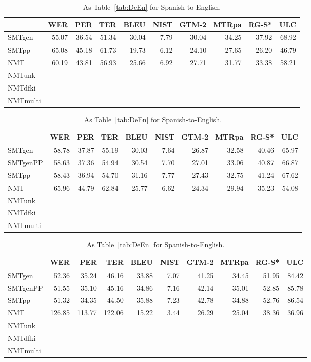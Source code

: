 \documentclass[a4paper,11pt]{article}
\begin{document}
\begin{table}[t]
\small
{}
\begin{tabular}{lrrrrrrrrr}
\toprule
         & WER   &  PER  & TER   &  BLEU & NIST & GTM-2 & MTRpa & RG-S* & ULC \\
\midrule
SMTgen	 & 55.07 & 36.54 & 51.34 & 30.04 & 7.79 & 30.04 & 34.25 & 37.92 & 68.92 \\  
SMTpp	 & 65.08 & 45.18 & 61.73 & 19.73 & 6.12 & 24.10 & 27.65 & 26.20 & 46.79 \\  
NMT	 & 60.19 & 43.81 & 56.93 & 25.66 & 6.92 & 27.71 & 31.77 & 33.38 & 58.21 \\  
NMTunk  \\
NMTdfki \\
NMTmulti \\
\bottomrule
\end{tabular}

\begin{tabular}{lrrrrrrrrr}
\toprule
         & WER   &  PER  & TER   &  BLEU & NIST & GTM-2 & MTRpa & RG-S* & ULC \\
\midrule
SMTgen	 & 58.78 & 37.87 & 55.19 & 30.03 & 7.64 & 26.87 & 32.58 & 40.46 & 65.97 \\  
SMTgenPP & 58.63 & 37.36 & 54.94 & 30.54 & 7.70 & 27.01 & 33.06 & 40.87 & 66.87 \\  
SMTpp	 & 58.43 & 36.94 & 54.70 & 31.16 & 7.77 & 27.43 & 32.75 & 41.24 & 67.62 \\  
NMT	 & 65.96 & 44.79 & 62.84 & 25.77 & 6.62 & 24.34 & 29.94 & 35.23 & 54.08 \\  
NMTunk  \\
NMTdfki \\
NMTmulti \\
\bottomrule
\end{tabular}


\begin{tabular}{lrrrrrrrrr}
\toprule
         & WER   &  PER  & TER   &  BLEU & NIST & GTM-2 & MTRpa & RG-S* & ULC \\
\midrule
SMTgen	 & 52.36 & 35.24 & 46.16 & 33.88 & 7.07 & 41.25 & 34.45 & 51.95 & 84.42 \\  
SMTgenPP & 51.55 & 35.10 & 45.16 & 34.86 & 7.16 & 42.14 & 35.01 & 52.85 & 85.78 \\  
SMTpp	 & 51.32 & 34.35 & 44.50 & 35.88 & 7.23 & 42.78 & 34.88 & 52.76 & 86.54 \\  
NMT	 & 126.85 & 113.77 & 122.06 & 15.22 & 3.44 & 26.29 & 25.04 & 38.36 & 36.96 \\  
NMTunk  \\
NMTdfki \\
NMTmulti \\
\bottomrule
\end{tabular}
 \caption{As Table~\ref{tab:DeEn} for Spanish-to-English.}
 \label{tab:EsEn}
\end{table}
\end{document}
